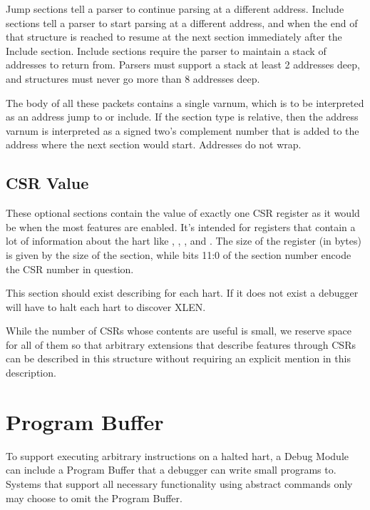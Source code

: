 Jump sections tell a parser to continue parsing at a different address. Include
sections tell a parser to start parsing at a different address, and when the
end of that structure is reached to resume at the next section immediately
after the Include section. Include sections require the parser to maintain a
stack of addresses to return from. Parsers must support a stack at least 2
addresses deep, and structures must never go more than 8 addresses deep.

The body of all these packets contains a single varnum, which is to be
interpreted as an address jump to or include. If the section type is relative,
then the address varnum is interpreted as a signed two's complement number that
is added to the address where the next section would start. Addresses do not
wrap.

\subsection{CSR Value} \label{sectionCsr}

These optional sections contain the value of exactly one CSR register as it
would be when the most features are enabled. It's intended for registers that
contain a lot of information about the hart like \Rmvendorid, \Rmarchid,
\Rmimpid, and \Rmisa. The size of the register (in bytes) is given by the size
of the section, while bits 11:0 of the section number encode the CSR number in
question.

This section should exist describing \Rmisa for each hart. If it does not exist
a debugger will have to halt each hart to discover XLEN.

\begin{commentary}
    While the number of CSRs whose contents are useful is small, we reserve
    space for all of them so that arbitrary extensions that describe features
    through CSRs can be described in this structure without requiring an
    explicit mention in this description.
\end{commentary}

\section{Program Buffer} \label{programbuffer}

To support executing arbitrary instructions on a halted hart,
a Debug Module can include a Program Buffer that a debugger
can write small programs to. Systems
that support all necessary functionality using abstract commands
only may choose to omit the Program Buffer.

